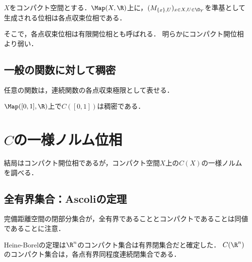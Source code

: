 \documentclass[uplatex,dvipdfmx]{jsreport}
\begin{document}
\begin{proposition}
    $X$をコンパクト空間とする．$\Map(X,\R)$上に，$(M_{\{x\},U})_{x\in X,U\in\O_Y}$を準基として生成される位相は各点収束位相である．
\end{proposition}
\begin{remarks}
    そこで，各点収束位相は有限開位相とも呼ばれる．
    明らかにコンパクト開位相より弱い．
\end{remarks}

\subsection{一般の関数に対して稠密}

\begin{tcolorbox}[colframe=ForestGreen, colback=ForestGreen!10!white,breakable,colbacktitle=ForestGreen!40!white,coltitle=black,fonttitle=\bfseries\sffamily,
title=]
    任意の関数は，連続関数の各点収束極限として表せる．
\end{tcolorbox}

\begin{proposition}
    $\Map([0,1],\R)$上で$C([0,1])$は稠密である．
\end{proposition}

\section{$C$の一様ノルム位相}

\begin{tcolorbox}[colframe=ForestGreen, colback=ForestGreen!10!white,breakable,colbacktitle=ForestGreen!40!white,coltitle=black,fonttitle=\bfseries\sffamily,
title=]
    結局はコンパクト開位相であるが，コンパクト空間$X$上の$C(X)$の一様ノルムを調べる．
\end{tcolorbox}

\subsection{全有界集合：Ascoliの定理}

\begin{tcolorbox}[colframe=ForestGreen, colback=ForestGreen!10!white,breakable,colbacktitle=ForestGreen!40!white,coltitle=black,fonttitle=\bfseries\sffamily,
title=]
    完備距離空間の閉部分集合が，全有界であることとコンパクトであることは同値であることに注意．

    Heine-Borelの定理は$\R^n$のコンパクト集合は有界閉集合だと確定した．
    $C(\R^n)$のコンパクト集合は，各点有界同程度連続閉集合である．
\end{tcolorbox}
\end{document}
